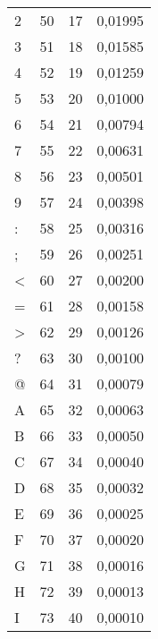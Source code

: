 \begin{table}[]
{\begin{tabular}{@{}llll@{}}
    2               & 50                  & 17               & 0,01995          \\
    3               & 51                  & 18               & 0,01585          \\
    4               & 52                  & 19               & 0,01259          \\
    5               & 53                  & 20               & 0,01000          \\
    6               & 54                  & 21               & 0,00794          \\
    7               & 55                  & 22               & 0,00631          \\
    8               & 56                  & 23               & 0,00501          \\
    9               & 57                  & 24               & 0,00398          \\
    :               & 58                  & 25               & 0,00316          \\
    ;               & 59                  & 26               & 0,00251          \\
    \textless{}     & 60                  & 27               & 0,00200          \\
    =               & 61                  & 28               & 0,00158          \\
    \textgreater{}  & 62                  & 29               & 0,00126          \\
    ?               & 63                  & 30               & 0,00100          \\
    @               & 64                  & 31               & 0,00079          \\
    A               & 65                  & 32               & 0,00063          \\
    B               & 66                  & 33               & 0,00050          \\
    C               & 67                  & 34               & 0,00040          \\
    D               & 68                  & 35               & 0,00032          \\
    E               & 69                  & 36               & 0,00025          \\
    F               & 70                  & 37               & 0,00020          \\
    G               & 71                  & 38               & 0,00016          \\
    H               & 72                  & 39               & 0,00013          \\
    I               & 73                  & 40               & 0,00010          \\ \bottomrule
    \end{tabular}%
    }
    \end{table}


